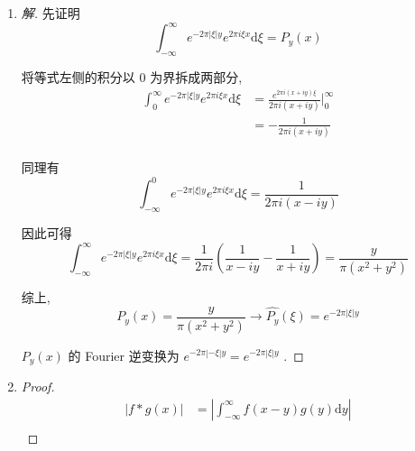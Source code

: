 \documentclass{article}
\begin{document}
\begin{enumerate}
\begin{proof}
        \begin{equation}
            \begin{aligned}
                \hat{g}(0)
                &=\int_{-\infty}^{\infty}g(x)\mathrm{d}x \\
                &=\int_{-1}^{0}(1+x)\mathrm{d}x+\int_{0}^{1}(1-x)\mathrm{d}x \\
                &=1 \\
            \end{aligned}
            \nonumber
        \end{equation} \par
    \end{proof}
    \item \begin{proof}[解]
        先证明 $$\int_{-\infty}^{\infty}e^{-2\pi|\xi|y}e^{2\pi i\xi x}\mathrm{d}\xi=P_y(x)$$ \par
        将等式左侧的积分以 $0$ 为界拆成两部分, \begin{equation}
            \begin{aligned}
                \int_{0}^{\infty}e^{-2\pi|\xi|y}e^{2\pi i\xi x}\mathrm{d}\xi
                &=\frac{e^{2\pi i(x+iy)\xi}}{2\pi i(x+iy)}\bigg|_{0}^{\infty} \\
                &=-\frac{1}{2\pi i(x+iy)} \\
            \end{aligned}
            \nonumber
        \end{equation} \par
        同理有 $$\int_{-\infty}^{0}e^{-2\pi|\xi|y}e^{2\pi i\xi x}\mathrm{d}\xi=\frac{1}{2\pi i(x-iy)}$$ \par
        因此可得 $$\int_{-\infty}^{\infty}e^{-2\pi|\xi|y}e^{2\pi i\xi x}\mathrm{d}\xi=\frac{1}{2\pi i}\left(\frac{1}{x-iy}-\frac{1}{x+iy}\right)=\frac{y}{\pi(x^2+y^2)}$$ \par
        综上, $$P_y(x)=\frac{y}{\pi(x^2+y^2)}\rightarrow\hat{P_y}(\xi)=e^{-2\pi|\xi|y}$$ \par
        $P_y(x)$ 的 Fourier 逆变换为 $e^{-2\pi|-\xi|y}=e^{-2\pi|\xi|y}$ .
    \end{proof}
    \item \begin{proof}
        \begin{equation}
            \begin{aligned}
                |f*g(x)|
                &=\left|\int_{-\infty}^{\infty}f(x-y)g(y)\mathrm{d}y\right| \\

\end{aligned}
\end{equation}
\end{proof}
\end{enumerate}
\end{document}
